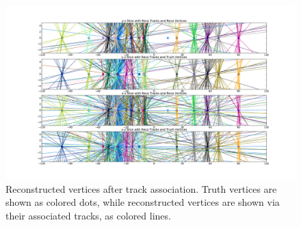 \begin{figure}[htbp]
    \centering
    \includegraphics[trim=120 70 120 70, clip, width=\linewidth]{Images/Other/track_association.pdf}
    \caption{Reconstructed vertices after track association. Truth vertices are shown as colored dots, while reconstructed vertices are shown via their associated tracks, as colored lines.}
    \label{fig:track_association}
\end{figure}
